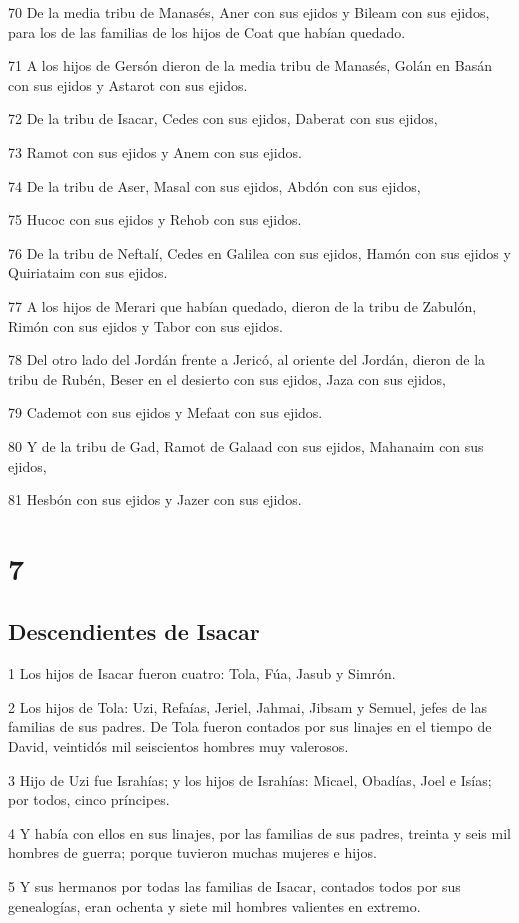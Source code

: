 \par 70 De la media tribu de Manasés, Aner con sus ejidos y Bileam con sus ejidos, para los de las familias de los hijos de Coat que habían quedado.
\par 71 A los hijos de Gersón dieron de la media tribu de Manasés, Golán en Basán con sus ejidos y Astarot con sus ejidos.
\par 72 De la tribu de Isacar, Cedes con sus ejidos, Daberat con sus ejidos,
\par 73 Ramot con sus ejidos y Anem con sus ejidos.
\par 74 De la tribu de Aser, Masal con sus ejidos, Abdón con sus ejidos,
\par 75 Hucoc con sus ejidos y Rehob con sus ejidos.
\par 76 De la tribu de Neftalí, Cedes en Galilea con sus ejidos, Hamón con sus ejidos y Quiriataim con sus ejidos.
\par 77 A los hijos de Merari que habían quedado, dieron de la tribu de Zabulón, Rimón con sus ejidos y Tabor con sus ejidos.
\par 78 Del otro lado del Jordán frente a Jericó, al oriente del Jordán, dieron de la tribu de Rubén, Beser en el desierto con sus ejidos, Jaza con sus ejidos,
\par 79 Cademot con sus ejidos y Mefaat con sus ejidos.
\par 80 Y de la tribu de Gad, Ramot de Galaad con sus ejidos, Mahanaim con sus ejidos,
\par 81 Hesbón con sus ejidos y Jazer con sus ejidos.

\chapter{7}

\section*{Descendientes de Isacar}

\par 1 Los hijos de Isacar fueron cuatro: Tola, Fúa, Jasub y Simrón.
\par 2 Los hijos de Tola: Uzi, Refaías, Jeriel, Jahmai, Jibsam y Semuel, jefes de las familias de sus padres. De Tola fueron contados por sus linajes en el tiempo de David, veintidós mil seiscientos hombres muy valerosos.
\par 3 Hijo de Uzi fue Israhías; y los hijos de Israhías: Micael, Obadías, Joel e Isías; por todos, cinco príncipes.
\par 4 Y había con ellos en sus linajes, por las familias de sus padres, treinta y seis mil hombres de guerra; porque tuvieron muchas mujeres e hijos.
\par 5 Y sus hermanos por todas las familias de Isacar, contados todos por sus genealogías, eran ochenta y siete mil hombres valientes en extremo.

